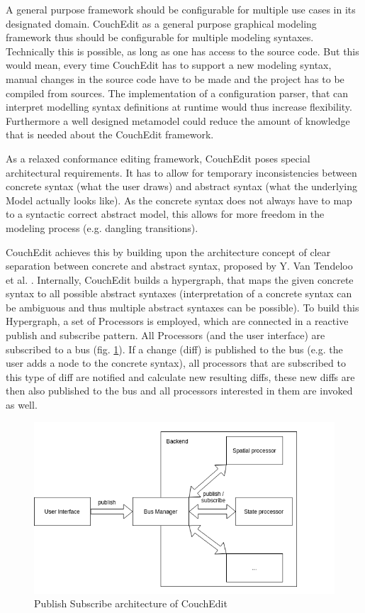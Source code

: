 \documentclass[10pt,a4paper,oneside]{scrartcl}
\begin{document}


A general purpose framework should be configurable for multiple use cases in its designated domain. CouchEdit as a general purpose graphical modeling framework thus should be configurable for multiple modeling syntaxes. Technically this is possible, as long as one has access to the source code. But this would mean, every time CouchEdit has to support a new modeling syntax, manual changes in the source code have to be made and the project has to be compiled from sources. The implementation of a configuration parser, that can interpret modelling syntax definitions at runtime would thus increase flexibility. Furthermore a well designed metamodel could reduce the amount of knowledge that is needed about the CouchEdit framework.

As a relaxed conformance editing framework, CouchEdit poses special architectural requirements. It has to allow for temporary inconsistencies between concrete syntax (what the user draws) and abstract syntax (what the underlying Model actually looks like). As the concrete syntax does not always have to map to a syntactic correct abstract model, this allows for more freedom in the modeling process (e.g. dangling transitions).

CouchEdit achieves this by building upon the architecture concept of clear separation between concrete and abstract syntax, proposed by Y. Van Tendeloo et al. \cite{van_tendeloo_concrete_2017}. Internally, CouchEdit builds a hypergraph, that maps the given concrete syntax to all possible abstract syntaxes (interpretation of a concrete syntax can be ambiguous and thus multiple abstract syntaxes can be possible). To build this Hypergraph, a set of Processors is employed, which are connected in a reactive publish and subscribe pattern. All Processors (and the user interface) are subscribed to a bus (fig. \ref{fig:processors}). If a change (diff) is published to the bus (e.g. the user adds a node to the concrete syntax), all processors that are subscribed to this type of diff are notified and calculate new resulting diffs, these new diffs are then also published to the bus and all processors interested in them are invoked as well.

\begin{figure}
  \label{fig:processors}
  \centering
  \includegraphics[width=.6\linewidth]{./couchedit-processors}
  \caption{Publish Subscribe architecture of CouchEdit}
\end{figure}
\end{document}
